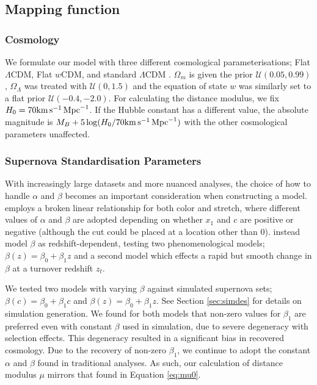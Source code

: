\documentclass[twocolumn,trackchanges,tighten]{aastex62}
\newcommand{\kmsmpc}{{\rm km}\,{\rm s}^{-1}\,{\rm Mpc}^{-1}}
\newcommand{\rubin}{\citetalias{Rubin2015}}
\begin{document}
\subsection{Mapping function}

\subsubsection{Cosmology}

We formulate our model with three different cosmological parameterisations; Flat $\Lambda$CDM, Flat $w$CDM, and standard $\Lambda$CDM . $\Omega_m$ is given the prior $\mathcal{U}(0.05, 0.99)$, $\Omega_\Lambda$ was treated with $\mathcal{U}(0, 1.5)$ and the equation of state $w$ was similarly set to a flat prior $\mathcal{U}(-0.4, -2.0)$. For calculating the distance modulus, we fix $H_0 = 70 \kmsmpc $. If the Hubble constant has a different value, the absolute magnitude is $M_B + 5\log(H_0/70 \kmsmpc )$ with the other cosmological parameters unaffected.

\subsubsection{Supernova Standardisation Parameters}

With increasingly large datasets and more nuanced analyses, the choice of how to handle $\alpha$ and $\beta$ becomes an important consideration when constructing a model. {\rubin} employs a broken linear relationship for both color and stretch, where different values of $\alpha$ and $\beta$ are adopted depending on whether $x_1$ and $c$ are positive or negative (although the cut could be placed at a location other than 0). \citet{Shariff2016} instead model $\beta$ as redshift-dependent, testing two phenomenological models; $\beta(z) = \beta_0 + \beta_1 z$ and a second model which effects a rapid but smooth change in $\beta$ at a turnover redshift $z_t$.

We tested two models with varying $\beta$ against simulated supernova sets; $\beta(c) = \beta_0 + \beta_1 c$ and $\beta(z) = \beta_0 + \beta_1 z$. See Section \ref{sec:simdes} for details on simulation generation. We found for both models that non-zero values for $\beta_1$ are preferred even with constant $\beta$ used in simulation, due to severe degeneracy with selection effects. This degeneracy resulted in a significant bias in recovered cosmology. Due to the recovery of non-zero $\beta_1$, we continue to adopt the constant $\alpha$ and $\beta$ found in traditional analyses. As such, our calculation of distance modulus $\mu$ mirrors that found in Equation \eqref{eq:mu0}.
\end{document}
